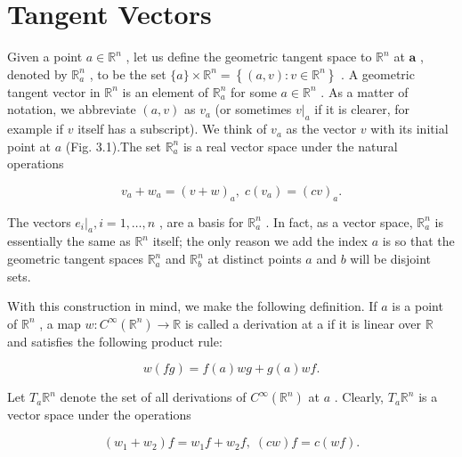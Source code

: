 

\section{Tangent Vectors}

\begin{definition}
\label{def:3-13-extra-1}
\leanok
Given a point $a \in  {\mathbb{R}}^{n}$ , let us define the geometric tangent space to ${\mathbb{R}}^{n}$ at $\mathbf{a}$ , denoted by ${\mathbb{R}}_{a}^{n}$ , to be the set $\{ a\}  \times  {\mathbb{R}}^{n} = \left\{  {\left( {a, v}\right)  : v \in  {\mathbb{R}}^{n}}\right\}$ . A geometric tangent vector in ${\mathbb{R}}^{n}$ is an element of ${\mathbb{R}}_{a}^{n}$ for some $a \in  {\mathbb{R}}^{n}$ . As a matter of notation, we abbreviate $\left( {a, v}\right)$ as ${v}_{a}$ (or sometimes ${\left. v\right| }_{a}$ if it is clearer, for example if $v$ itself has a subscript). We think of ${v}_{a}$ as the vector $v$ with its initial point at $a$ (Fig. 3.1).The set ${\mathbb{R}}_{a}^{n}$ is a real vector space under the natural operations

\[
{v}_{a} + {w}_{a} = {\left( v + w\right) }_{a},\;c\left( {v}_{a}\right)  = {\left( cv\right) }_{a}.
\]

The vectors ${\left. {e}_{i}\right| }_{a}, i = 1,\ldots , n$ , are a basis for ${\mathbb{R}}_{a}^{n}$ . In fact, as a vector space, ${\mathbb{R}}_{a}^{n}$ is essentially the same as ${\mathbb{R}}^{n}$ itself; the only reason we add the index $a$ is so that the geometric tangent spaces ${\mathbb{R}}_{a}^{n}$ and ${\mathbb{R}}_{b}^{n}$ at distinct points $a$ and $b$ will be disjoint sets.
\end{definition}

\begin{definition}
\label{def:3-13-extra-2}
\mathlibok
With this construction in mind, we make the following definition. If $a$ is a point of ${\mathbb{R}}^{n}$ , a map $w : {C}^{\infty }\left( {\mathbb{R}}^{n}\right)  \rightarrow  \mathbb{R}$ is called a derivation at a if it is linear over $\mathbb{R}$ and satisfies the following product rule:

\[
w\left( {fg}\right)  = f\left( a\right) {wg} + g\left( a\right) {wf}. \tag{3.3}
\]

Let ${T}_{a}{\mathbb{R}}^{n}$ denote the set of all derivations of ${C}^{\infty }\left( {\mathbb{R}}^{n}\right)$ at $a$ . Clearly, ${T}_{a}{\mathbb{R}}^{n}$ is a vector space under the operations

\[
\left( {{w}_{1} + {w}_{2}}\right) f = {w}_{1}f + {w}_{2}f,\;\left( {cw}\right) f = c\left( {wf}\right) .
\]
\end{definition}

